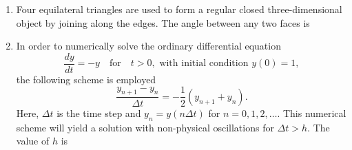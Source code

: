 \documentclass[journal]{IEEEtran}
\begin{document}
\begin{enumerate}[leftmargin=0pt]
\begin{enumerate}
\end{enumerate}

\hfill{}

\vspace{4mm}

\item
Four equilateral triangles are used to form a regular closed three-dimensional object by joining along the edges. The angle between any two faces is 

\vspace{2mm}

\begin{enumerate}
\end{enumerate}

\hfill{}

\vspace{4mm}

\item
In order to numerically solve the ordinary differential equation
\[
\frac{dy}{dt} = -y \quad \text{for} \quad t > 0, \text{ with initial condition } y(0) = 1,
\]
the following scheme is employed
\[
\frac{y_{n+1} - y_n}{\Delta t} = -\frac{1}{2} \left(y_{n+1} + y_n \right).
\]
Here, $\Delta t$ is the time step and $y_n = y(n \Delta t)$ for $n = 0,1,2,\ldots$. This numerical scheme will yield a solution with non-physical oscillations for $\Delta t > h$. The value of $h$ is

\vspace{2mm}

\begin{enumerate}
\end{enumerate}


\end{enumerate}
\end{document}
